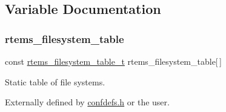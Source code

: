 \subsection{Variable Documentation}
\mbox{\label{group__FileSystemTypesAndMount_ga752ec6b29e7d936b663d74eff727f0ca}} 
\subsubsection{\texorpdfstring{rtems\_filesystem\_table}{rtems\_filesystem\_table}}
{\footnotesize\ttfamily const \mbox{\hyperlink{structrtems__filesystem__table__t}{rtems\+\_\+filesystem\+\_\+table\+\_\+t}} rtems\+\_\+filesystem\+\_\+table\mbox{[}$\,$\mbox{]}}



Static table of file systems. 

Externally defined by \mbox{\hyperlink{confdefs_8h}{confdefs.\+h}} or the user. 